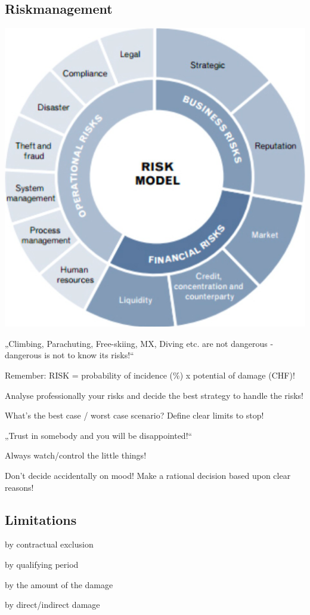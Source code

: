 \subsection{Riskmanagement}
\includegraphics[width=1\linewidth]{images/riskmodel}
\begin{compactitem}
	\item „Climbing, Parachuting, Free-skiing, MX, Diving etc. are not dangerous - dangerous is not to know its risks!“
	\item Remember: RISK = probability of incidence (\%) x potential of damage (CHF)!
	\item Analyse professionally your risks and decide the best strategy to handle the risks!
	\item What’s the best case / worst case scenario? Define clear limits to stop!
	\item „Trust in somebody and you will be disappointed!“
	\item Always watch/control the little things!
	\item Don’t decide accidentally on mood! Make a rational decision based upon clear reasons!
\end{compactitem}

\subsection{Limitations}
\begin{compactitem}
	\item by contractual exclusion
	\item by qualifying period
	\item by the amount of the damage
	\item by direct/indirect damage
\end{compactitem}

